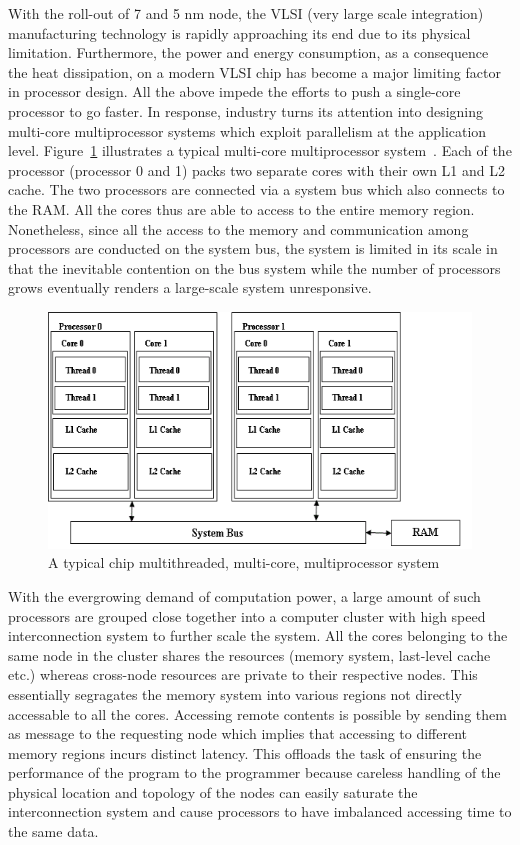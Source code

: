 With the roll-out of 7 and 5 nm node, the VLSI (very large scale integration) 
manufacturing technology is rapidly approaching its end due to its physical 
limitation. Furthermore, the power and energy consumption, as a consequence the 
heat dissipation, on a modern VLSI chip has become a major limiting factor in 
processor design. All the above impede the efforts to push a single-core 
processor to go faster. In response, industry turns its attention into 
designing multi-core multiprocessor systems which exploit parallelism at the 
application level. Figure~\ref{fig:multicore} illustrates a typical multi-core 
multiprocessor system~\cite{ibm_multicore}. Each of the processor (processor 0 
and 1) packs two separate cores with their own L1 and L2 cache. The two 
processors are connected via a system bus which also connects to the RAM. All 
the cores thus are able to access to the entire memory region. Nonetheless, 
since all the access to the memory and communication among processors are 
conducted on the system bus, the system is limited in its scale in that the 
inevitable contention on the bus system while the number of processors grows 
eventually renders a large-scale system unresponsive.
\begin{figure}[H]
    \centerline{\includegraphics[scale=0.50]{background/figs/multicore_mp_system.png}}
    \caption{A typical chip multithreaded, multi-core, multiprocessor system}
    \label{fig:multicore}
\end{figure}

With the evergrowing demand of computation power, a large amount of such 
processors are grouped close together into a computer cluster with high speed 
interconnection system to further scale the system. All the cores belonging to 
the same node in the cluster shares the resources (memory system, last-level 
cache etc.) whereas cross-node resources are private to their respective nodes. 
This essentially segragates the memory system into various regions not directly 
accessable to all the cores. Accessing remote contents is possible by sending 
them as message to the requesting node which implies that accessing to different 
memory regions incurs distinct latency.  This offloads the task of ensuring the 
performance of the program to the programmer because careless handling of the 
physical location and topology of the nodes can easily saturate the 
interconnection system and cause processors to have imbalanced accessing time to 
the same data.

